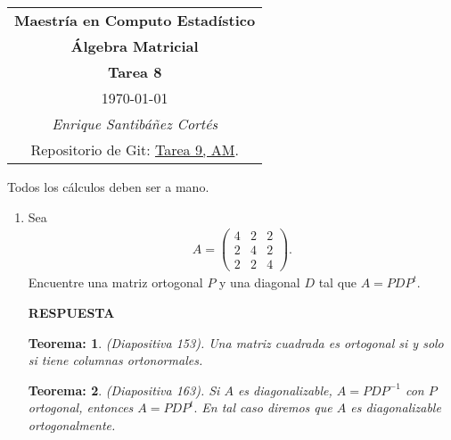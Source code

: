 \documentclass[11pt,letterpaper]{article}
\newcommand{\res}{\textbf{RESPUESTA}\\}
\newtheorem{thmt}{Teorema:}
\begin{document}
\begin{table}[ht]
\centering
\begin{tabular}{c}
\textbf{Maestría en Computo Estadístico}\\
\textbf{Álgebra Matricial} \\
\textbf{Tarea 8}\\
\today \\
\emph{Enrique Santibáñez Cortés}\\
Repositorio de Git: \href{https://github.com/Enriquesec/Algebra_matricial/tree/master/tareas/Tarea_9}{Tarea 9, AM}.
\end{tabular}
\end{table}
Todos los cálculos deben ser a mano.

\begin{enumerate}
\item Sea 
\begin{align*}
A=\begin{pmatrix}
4 & 2 & 2\\
2 & 4 & 2\\
2 & 2 & 4
\end{pmatrix}.
\end{align*}
Encuentre una matriz ortogonal $P$ y una diagonal $D$ tal que $A=PDP^t$. 

\res \begin{framed}
    \begin{thmt} \label{t_matriz_ortogonal}
	(Diapositiva 153). Una matriz cuadrada es ortogonal si y solo si tiene columnas ortonormales.
	    \end{thmt}
\end{framed}
 
\begin{framed}
    \begin{thmt} \label{t_diagonalizable_ortogonalmente}
	(Diapositiva 163). Si $A$ es diagonalizable, $A=PDP^{-1}$ con $P$ ortogonal, entonces $A=PDP^t.$ En tal caso diremos que $A$ es diagonalizable ortogonalmente. 
    \end{thmt}
\end{framed}


\end{enumerate}
\end{document}
